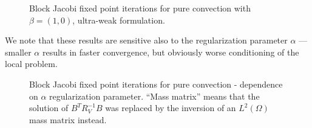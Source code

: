 \documentclass{article}
\newcommand{\LRp}[1]{\left( #1 \right)}
\renewcommand{\L}{L^2\LRp{\Omega}}
\begin{document}
\begin{figure}
\caption{Block Jacobi fixed point iterations for pure convection with $\beta = (1,0)$, ultra-weak formulation.}
\end{figure}

We note that these results are sensitive also to the regularization parameter $\alpha$ --- smaller $\alpha$ results in faster convergence, but obviously worse conditioning of the local problem.  
\begin{figure}
\centering
{}
\caption{Block Jacobi fixed point iterations for pure convection - dependence on $\alpha$ regularization parameter.  ``Mass matrix'' means that the solution of $B^TR_V^{-1}B$ was replaced by the inversion of an $\L$ mass matrix instead.}
\end{figure}
\end{document}
